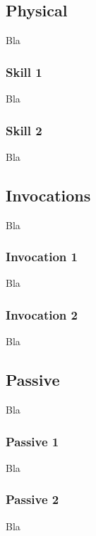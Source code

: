 \documentclass[a4paper,12pt]{book}
\begin{document}
\subsection{Physical}
Bla
\subsubsection{Skill 1}
Bla
\subsubsection{Skill 2}
Bla
\subsection{Invocations}
Bla
\subsubsection{Invocation 1}
Bla
\subsubsection{Invocation 2}
Bla
\subsection{Passive}
Bla
\subsubsection{Passive 1}
Bla
\subsubsection{Passive 2}
Bla
\end{document}
